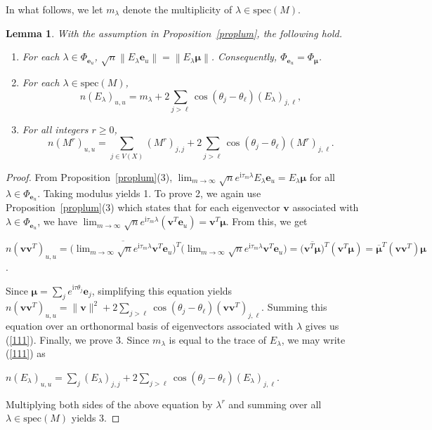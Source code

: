\documentclass[11pt]{article}
\newtheorem{lemma}{Lemma}
\newcommand{\be}{\mathbf e}
\newcommand{\bv}{\mathbf v}
\newcommand{\bmu}{{\boldsymbol{\mu}}}
\def\ii{\mathrm{i}}
\newcommand\spec{{\mathrm{spec}}}
\newcommand{\supp}{{\Phi}}
\begin{document}
In what follows, we let $m_\lambda$ denote the multiplicity of $\lambda\in\spec(M)$.

\begin{lemma}
\label{Lem:no1col}
With the assumption in Proposition~\ref{proplum}, the following hold. 
\begin{enumerate}
\item For each $\lambda\in\supp_{\be_u}$, $\sqrt{n}\left\|E_\lambda\be_u\right\|=\left\|E_\lambda\bmu\right\|$. Consequently, $\supp_{\be_u}=\supp_{\bmu}$.
\item 
For each $\lambda\in\spec(M)$, %
\begin{equation}
\label{111}
n(E_\lambda)_{u,u}=m_\lambda+2\sum_{j>\ell}\cos(\theta_j-\theta_{\ell})(E_\lambda)_{j,{\ell}},
\end{equation}
\item For all integers $r\geq 0$,
\begin{equation}
\label{cosp}
n(M^r)_{u,u}=\sum_{j\in V(X)}(M^r)_{j,j}+2\sum_{j>\ell}\cos(\theta_j-\theta_{\ell})(M^r)_{j,{\ell}}.
\end{equation}
\end{enumerate}
\end{lemma}

\begin{proof}
From Proposition~\ref{proplum}(3),
$\displaystyle\lim_{m\rightarrow\infty}\sqrt{n}e^{\ii \tau_m\lambda}E_\lambda\be_u=E_\lambda\bmu$ for all $\lambda\in\supp_{\be_u}$. Taking modulus yields 1. To prove 2, we again use Proposition~\ref{proplum}(3) which states that for each eigenvector $\bv$ associated with $\lambda\in\supp_{\be_u}$, we have $\displaystyle\lim_{m\rightarrow\infty}\sqrt{n}e^{\ii \tau_m\lambda}(\bv^T\be_u)=\bv^T\bmu$. From this, we get
\begin{center}
$n(\bv\bv^T)_{u,u}=\big(\overline{\displaystyle\lim_{m\rightarrow\infty}\sqrt{n}e^{\ii \tau_m\lambda}\bv^T\be_u}\big)^T\big(\displaystyle\lim_{m\rightarrow\infty}\sqrt{n}e^{\ii \tau_m\lambda}\bv^T\be_u\big)=\big(\overline{\bv^T\bmu}\big)^T(\bv^T\bmu)=\overline{\bmu}^T(\bv\bv^T)\bmu$.
\end{center}
Since $\bmu=\sum_{j}e^{\ii \tau\theta_j}\be_j$, simplifying this equation yields $n(\bv\bv^T)_{u,u}=\|\bv\|^2+2\sum_{j>\ell}\cos(\theta_j-\theta_\ell)(\bv\bv^T)_{j,\ell}$. Summing this equation over an orthonormal basis of eigenvectors associated with $\lambda$ gives us (\ref{111}). Finally, we prove 3. Since $m_\lambda$ is equal to the trace of $E_\lambda$, we may write (\ref{111}) as
\begin{center}
$n(E_\lambda)_{u,u}=\sum_{j}(E_\lambda)_{j,j}+2\sum_{j>\ell}\cos(\theta_j-\theta_{\ell})(E_\lambda)_{j,{\ell}}.$
\end{center}
Multiplying both sides of the above equation by $\lambda^r$ and summing over all $\lambda\in\spec(M)$ yields 3.
\end{proof}
\end{document}
